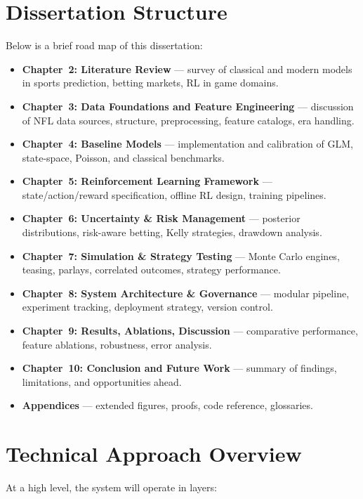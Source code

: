 \section{Dissertation Structure}

Below is a brief road map of this dissertation:

\begin{itemize}
  \item \textbf{Chapter~2: Literature Review} — survey of classical and modern models in sports prediction, betting markets, RL in game domains.
  \item \textbf{Chapter~3: Data Foundations and Feature Engineering} — discussion of NFL data sources, structure, preprocessing, feature catalogs, era handling.
  \item \textbf{Chapter~4: Baseline Models} — implementation and calibration of GLM, state-space, Poisson, and classical benchmarks.
  \item \textbf{Chapter~5: Reinforcement Learning Framework} — state/action/reward specification, offline RL design, training pipelines.
  \item \textbf{Chapter~6: Uncertainty \& Risk Management} — posterior distributions, risk-aware betting, Kelly strategies, drawdown analysis.
  \item \textbf{Chapter~7: Simulation \& Strategy Testing} — Monte Carlo engines, teasing, parlays, correlated outcomes, strategy performance.
  \item \textbf{Chapter~8: System Architecture \& Governance} — modular pipeline, experiment tracking, deployment strategy, version control.
  \item \textbf{Chapter~9: Results, Ablations, Discussion} — comparative performance, feature ablations, robustness, error analysis.
  \item \textbf{Chapter~10: Conclusion and Future Work} — summary of findings, limitations, and opportunities ahead.
  \item \textbf{Appendices} — extended figures, proofs, code reference, glossaries.
\end{itemize}

\section{Technical Approach Overview}

At a high level, the system will operate in layers:

